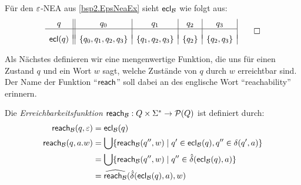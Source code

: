 \begin{Bsp*}
Für den $\varepsilon$-NEA aus \autoref{bsp2.EpsNeaEx} sieht $\textsf{ecl}_{\mathcal{B}}$ wie folgt aus:
\[
\begin{array}{c||c|c|c|c|c|c}
   q  & q_0 & q_1 & q_2 & q_3\\ \hline
& & & &\\[-.5em]
\textsf{ecl}(q) & \{q_0, q_1, q_2, q_3\} & \{q_1, q_2, q_3\} & \{q_2\} & \{q_2, q_3\}
\end{array}
\qedhere
\]
\end{Bsp*}


Als Nächstes definieren wir eine mengenwertige Funktion, die uns für
einen Zustand $q$ und ein Wort $w$ sagt, welche Zustände von $q$ durch
$w$ erreichtbar sind. Der Name der Funktion "`$\textsf{reach}$"'
soll dabei an des englische Wort "`reachability"' erinnern.  

\begin{Def}
  Die \emph{Erreichbarkeitsfunktion} $\textsf{reach}_{\mathcal{B}} : Q\times\Sigma^*\to \mathcal{P}(Q)$ ist definiert durch:
  \begin{align*}
    \textsf{reach}_{\mathcal{B}} (q, \varepsilon) & = \textsf{ecl}_{\mathcal{B}}(q) \\
    \textsf{reach}_{\mathcal{B}} (q, a.w)  & = \bigcup\{ \textsf{reach}_{\mathcal{B}} (q'', w) \mid  q' \in \textsf{ecl}_{\mathcal{B}} (q), q'' \in \delta (q', a) \} \\
                        & = \bigcup\{ \textsf{reach}_{\mathcal{B}} (q'', w) \mid  q'' \in \hat\delta (\textsf{ecl}_{\mathcal{B}} (q), a) \} \\
    & = \widehat{\textsf{reach}_{\mathcal{B}}} (\hat\delta (\textsf{ecl}_{\mathcal{B}} (q), a), w)
  \end{align*}
\end{Def}

